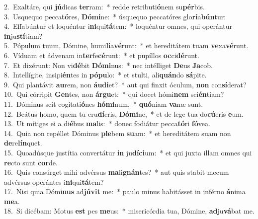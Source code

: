 {2.~}Exaltáre, qui \textbf{jú}dicas \textbf{ter}ram:~* redde retributi\textbf{ó}nem su\textbf{pér}bis.\\
{3.~}Usquequo pecca\textbf{tó}res, \textbf{Dó}\textbf{mi}ne:~* úsquequo peccatóres glo\textbf{ri}a\textbf{bún}tur:\\
{4.~}Effabúntur et loquéntur i\textbf{ni}qui\textbf{tá}tem:~* loquéntur omnes, qui operántur \textbf{in}ju\textbf{stí}tiam?\\
{5.~}Pópulum tuum, Dómine, humi\textbf{li}a\textbf{vé}runt:~* et hereditátem tuam \textbf{ve}xa\textbf{vé}runt.\\
{6.~}Víduam et ádvenam in\textbf{ter}fe\textbf{cé}runt:~* et pupíllos \textbf{oc}ci\textbf{dé}runt.\\
{7.~}Et dixérunt: Non vi\textbf{dé}bit \textbf{Dó}\textbf{mi}nus:~* nec intélliget \textbf{De}us \textbf{Ja}cob.\\
{8.~}Intellígite, insipi\textbf{én}tes in \textbf{pó}\textbf{pu}lo:~* et stulti, ali\textbf{quán}do \textbf{sá}pite.\\
{9.~}Qui plantávit \textbf{au}rem, non \textbf{áu}\textbf{di}et?~* aut qui finxit óculum, \textbf{non} con\textbf{sí}derat?\\
{10.~}Qui córripit \textbf{Gen}tes, non \textbf{ár}\textbf{gu}et:~* qui docet hómi\textbf{nem} sci\textbf{én}tiam?\\
{11.~}Dóminus scit cogitati\textbf{ó}nes \textbf{hó}\textbf{mi}num,~* \textbf{quó}niam \textbf{va}næ sunt.\\
{12.~}Beátus homo, quem tu eru\textbf{dí}eris, \textbf{Dó}\textbf{mi}ne,~* et de lege tua do\textbf{cú}eris \textbf{e}um.\\
{13.~}Ut mítiges ei a di\textbf{é}bus \textbf{ma}lis:~* donec fodiátur pecca\textbf{tó}ri \textbf{fó}vea.\\
{14.~}Quia non repéllet Dóminus \textbf{ple}bem \textbf{su}am:~* et hereditátem suam non \textbf{de}re\textbf{lín}quet.\\
{15.~}Quoadúsque justítia convertátur \textbf{in} ju\textbf{dí}\textbf{ci}um:~* et qui juxta illam omnes qui \textbf{re}cto sunt \textbf{cor}de.\\
{16.~}Quis consúrget mihi advérsus \textbf{ma}li\textbf{gnán}tes?~* aut quis stabit mecum advérsus operántes i\textbf{ni}qui\textbf{tá}tem?\\
{17.~}Nisi quia Dómi\textbf{nus} ad\textbf{jú}\textbf{vit} me:~* paulo minus habitásset in inférno \textbf{á}nima \textbf{me}a.\\
{18.~}Si dicébam: Motus \textbf{est} pes \textbf{me}us:~* misericórdia tua, Dómine, \textbf{ad}ju\textbf{vá}bat me.\\
